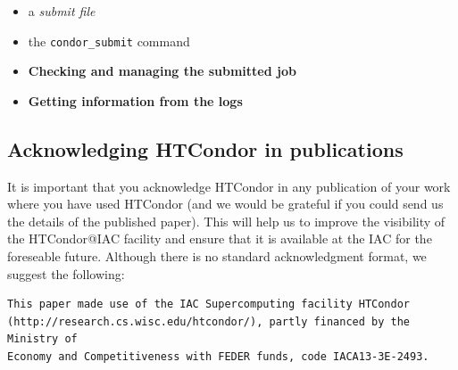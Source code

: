 \documentclass[a4paper,10pt]{article}
\begin{document}
\begin{itemize}
\begin{itemize}
\begin{mdframed}
\begin{lstlisting}
main(int argc, char **argv)
{
    int sleep_time;
    int input;
    int failure;

    if (argc != 3) {
        printf("Usage: simple <sleep-time> <integer>\n");
        failure = 1;
    } else {
        sleep_time = atoi(argv[1]);
        input      = atoi(argv[2]);

        printf("Thinking really hard for %d seconds...\n", sleep_time);
        sleep(sleep_time);
        printf("We calculated: %d\n", input * 2);
        failure = 0;
    }
    return failure;
}
\end{lstlisting}
\end{mdframed}

You would compile it as usual:

\begin{mdframed}
\lstset{language=bash,label= ,caption= ,captionpos=b,numbers=none}
\begin{lstlisting}
gcc -o simple simple.c
\end{lstlisting}
\end{mdframed}

\item a \emph{submit file}

\item the \texttt{condor\_submit} command
\end{itemize}
\end{itemize}


\begin{itemize}
\item \textbf{Checking and managing the submitted job}
\item \textbf{Getting information from the logs}
\end{itemize}


\subsection{Acknowledging HTCondor in publications}
\label{sec:org1cd46ef}

It is important that you acknowledge HTCondor in any publication of your work
where you have used HTCondor (and we would be grateful if you could send us the
details of the published paper). This will help us to improve the visibility of
the HTCondor@IAC facility and ensure that it is available at the IAC for the
foreseable future. Although there is no standard acknowledgment format, we
suggest the following:

\begin{verbatim}
This paper made use of the IAC Supercomputing facility HTCondor
(http://research.cs.wisc.edu/htcondor/), partly financed by the Ministry of
Economy and Competitiveness with FEDER funds, code IACA13-3E-2493.
\end{verbatim}
\end{document}
